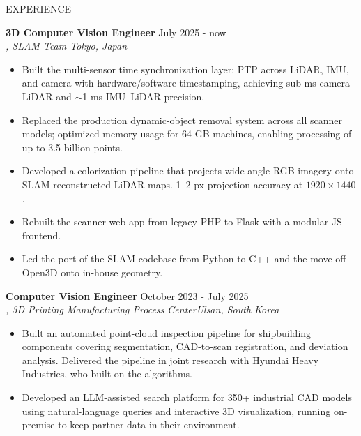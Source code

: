 \documentclass{resume} %
\begin{document}
\vspace{-0.2cm}
\begin{rSection}{EXPERIENCE}
\vspace{-0.05cm}

\textbf{3D Computer Vision Engineer} \hfill July 2025 - now\\
\textit{{\href{https://vitom-tech.com/en/}{\color{blue}{VITOM Inc.}}}, {SLAM Team} \hfill {Tokyo, Japan}} \\

\vspace{-0.75cm}
\begin{itemize}
    \itemsep -7pt {}
    \item Built the multi-sensor time synchronization layer: PTP across LiDAR, IMU, and camera with hardware/software timestamping, achieving sub-ms camera--LiDAR and $\sim$1 ms IMU--LiDAR precision.
    \item Replaced the production dynamic-object removal system across all scanner models; optimized memory usage for 64 GB machines, enabling processing of up to 3.5 billion points.
    \item Developed a colorization pipeline that projects wide-angle RGB imagery onto SLAM-reconstructed LiDAR maps. 1--2 px projection accuracy at $1920\times1440$.
    \item Rebuilt the scanner web app from legacy PHP to Flask with a modular JS frontend.
    \item Led the port of the SLAM codebase from Python to C++ and the move off Open3D onto in-house geometry.
\end{itemize}

\vspace{-0.15cm}
\textbf{Computer Vision Engineer} \hfill October 2023 - July 2025\\
\textit{{\href{https://kamic.or.kr/en/regional-center/ulsan/}{\color{blue}{Korea Institute of Industrial Technology}}}, 3D Printing Manufacturing Process Center\hfill {Ulsan, South Korea}} \\

\vspace{-0.75cm}
\begin{itemize}
    \itemsep -7pt {}
    \item Built an automated point-cloud inspection pipeline for shipbuilding components covering segmentation, CAD-to-scan registration, and deviation analysis. Delivered the pipeline in joint research with Hyundai Heavy Industries, who built on the algorithms.
    \item Developed an LLM-assisted search platform for 350+ industrial CAD models using natural-language queries and interactive 3D visualization, running on-premise to keep partner data in their environment.
\end{itemize}


\end{rSection}
\end{document}
